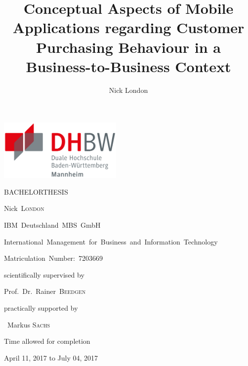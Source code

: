 \documentclass[12pt,a4paper,final,oneside,openright,onecolumn,titlepage]{scrbook}
\author{Nick London}
\title{Conceptual Aspects of Mobile Applications regarding Customer Purchasing Behaviour in a Business-to-Business Context}
\newcounter{savepage}
\begin{document}
\begin{titlepage}
	\includegraphics[height=8em]{img/logos/dhbw.pdf}
	\hfill
	\par
	\centering
	\vfill
	{\huge \textsc{\MakeUppercase{Bachelorthesis}}\par}
	\vspace{2em}
	{\Huge \textbf{\thetitle}\par}
	\vspace{1.5em}
	{\large Nick~\textsc{London}\par}
	\vfill
	{\small IBM~Deutschland~MBS~GmbH\par
	International~Management~for~Business~and~Information~Technology \par
	Matriculation~Number:~7203669}
	\vfill
	{scientifically supervised by\par Prof.~Dr.~Rainer~\textsc{Beedgen}\par}
	\par\vspace{1em}
	{practically supported by\par ~Markus \textsc{Sachs}\par}
	\vspace{2em}
	{Time allowed for completion\par April 11, 2017 to July 04, 2017\par}
\end{titlepage}

\setcounter{page}{1}

\tableofcontents

\newpage
{}
\listoffigures

\newpage
{}
\listoftables



\newpage

\setcounter{page}{1}
\end{document}
